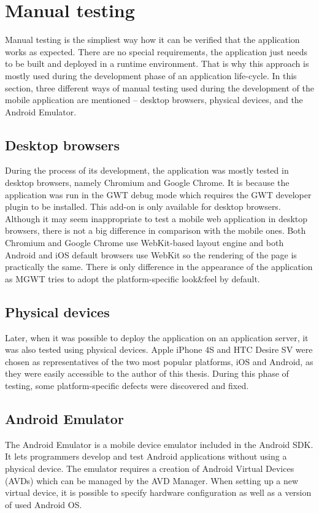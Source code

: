 \documentclass[12pt,oneside,final]{fithesis2}
\begin{document}
\section{Manual testing}
Manual testing is the simpliest way how it can be verified that the application works as expected.
There are no special requirements, the application just needs to be built and deployed in a runtime environment.
That is why this approach is mostly used during the development phase of an application life-cycle.
In this section, three different ways of manual testing used during the development of the mobile application are mentioned -- desktop browsers, physical devices, and the Android Emulator.

\subsection{Desktop browsers}
During the process of its development, the application was mostly tested in desktop browsers, namely Chromium and Google Chrome.
It is because the application was run in the GWT debug mode which requires the GWT developer plugin to be installed.
This add-on is only available for desktop browsers.
Although it may seem inappropriate to test a mobile web application in desktop browsers, there is not a big difference in comparison with the mobile ones.
Both Chromium and Google Chrome use WebKit-based layout engine and both Android and iOS default browsers use WebKit so the rendering of the page is practically the same.
There is only difference in the appearance of the application as MGWT tries to adopt the platform-specific look\&feel by default.

\subsection{Physical devices}
Later, when it was possible to deploy the application on an application server, it was also tested using physical devices.
Apple iPhone 4S and HTC Desire SV were chosen as representatives of the two most popular platforms, iOS and Android, as they were easily accessible to the author of this thesis.
During this phase of testing, some platform-specific defects were discovered and fixed.

\subsection{Android Emulator}
The Android Emulator is a mobile device emulator included in the Android SDK\footnotemark{}.
It lets programmers develop and test Android applications without using a physical device.
The emulator requires a creation of Android Virtual Devices (AVDs) which can be managed by the AVD Manager.
When setting up a new virtual device, it is possible to specify hardware configuration as well as a version of used Android OS.
\end{document}
